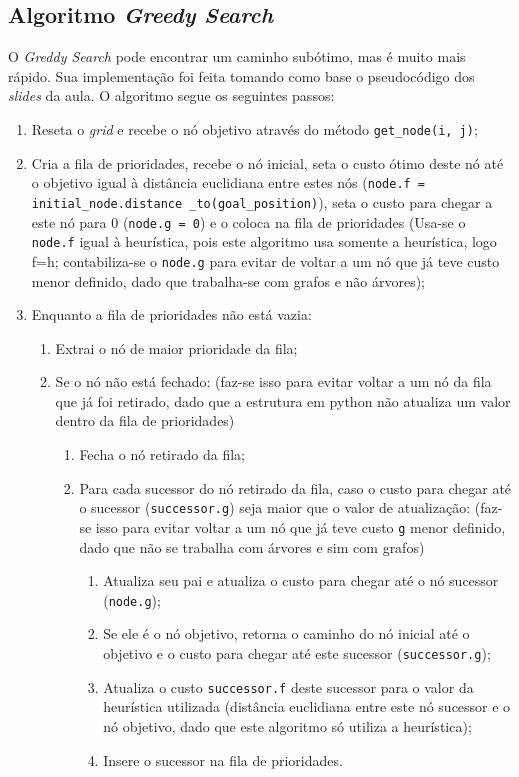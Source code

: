 \documentclass[brazil, 12pt]{article}
\begin{document}
\subsection{Algoritmo \emph{Greedy Search}}
O \textit{Greddy Search} pode encontrar um caminho subótimo, mas é muito mais rápido. Sua implementação foi feita tomando como base o pseudocódigo dos \textit{slides} da aula. O algoritmo segue os seguintes passos:
\begin{enumerate}
	\item Reseta o \textit{grid} e recebe o nó objetivo através do método \texttt{get\_node(i, j)};
	\item Cria a fila de prioridades, recebe o nó inicial, seta o custo ótimo deste nó até o objetivo igual à distância euclidiana entre estes nós (\texttt{node.f = initial\_node.distance \_to(goal\_position)}), seta o custo para chegar a este nó para 0 (\texttt{node.g = 0}) e o coloca na fila de prioridades \textcolor{blue!70}{(Usa-se o \texttt{node.f} igual à heurística, pois este algoritmo usa somente a heurística, logo f=h; contabiliza-se o \texttt{node.g} para evitar de voltar a um nó que já teve custo menor definido, dado que trabalha-se com grafos e não árvores)};
	\item Enquanto a fila de prioridades não está vazia:
	\begin{enumerate}
		\item Extrai o nó de maior prioridade da fila;
		\item Se o nó não está fechado: \textcolor{blue!70}{(faz-se isso para evitar voltar a um nó da fila que já foi retirado, dado que a estrutura em python não atualiza um valor dentro da fila de prioridades)}
		\begin{enumerate}
			\item Fecha o nó retirado da fila;
			\item Para cada sucessor do nó retirado da fila, caso o custo para chegar até o sucessor (\texttt{successor.g}) seja maior que o valor de atualização: \textcolor{blue!70}{(faz-se isso para evitar voltar a um nó que já teve custo \texttt{g} menor definido, dado que não se trabalha com árvores e sim com grafos)}
			\begin{enumerate}
				\item Atualiza seu pai e atualiza o custo para chegar até o nó sucessor (\texttt{node.g});
				\item Se ele é o nó objetivo, retorna o caminho do nó inicial até o objetivo e o custo para chegar até este sucessor (\texttt{successor.g});
				\item Atualiza o custo \texttt{successor.f} deste sucessor para o valor da heurística utilizada (distância euclidiana entre este nó sucessor e o nó objetivo, \textcolor{blue!70}{dado que este algoritmo só utiliza a heurística});
				\item Insere o sucessor na fila de prioridades.
			\end{enumerate}
		\end{enumerate}
	\end{enumerate}
\end{enumerate}
\end{document}
